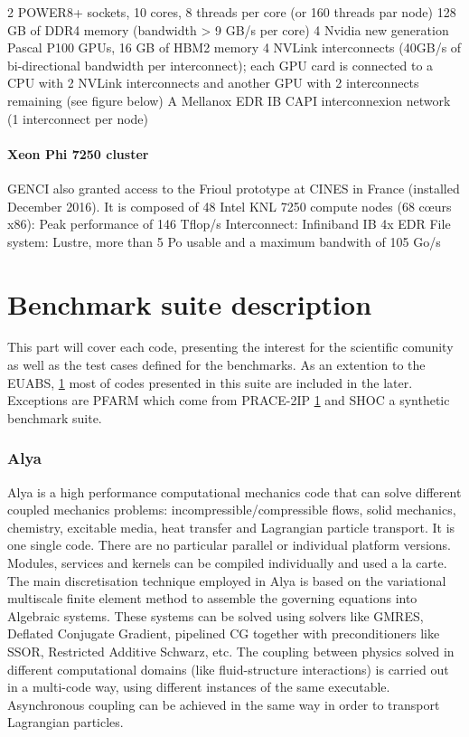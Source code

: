 2 POWER8+ sockets, 10 cores, 8 threads per core (or 160 threads par node)
128 GB of DDR4 memory (bandwidth > 9 GB/s per core)
4 Nvidia new generation Pascal P100 GPUs, 16 GB of HBM2 memory
4 NVLink interconnects (40GB/s of bi-directional bandwidth per interconnect); each GPU card is connected to a CPU with 2 NVLink interconnects and another GPU with 2 interconnects remaining (see figure below)
A Mellanox EDR IB CAPI interconnexion network (1 interconnect per node)


\subsection{Xeon Phi 7250 cluster}
GENCI also granted access to the Frioul prototype at CINES in France (installed December 2016). It is composed of 48 Intel KNL 7250 compute nodes (68 cœurs x86):
Peak performance of 146 Tflop/s
Interconnect: Infiniband IB 4x EDR
File system: Lustre, more than 5 Po usable and a maximum bandwith of 105 Go/s


\part{Benchmark suite description}
This part will cover each code, presenting the interest for the scientific comunity as well as the test cases defined for the benchmarks.
As an extention to the EUABS, \ref{} most of codes presented in this suite are included in the later. Exceptions are PFARM which come from PRACE-2IP \ref{} and SHOC a synthetic benchmark suite.

\section{Alya}
Alya is a high performance computational mechanics code that can solve different coupled mechanics problems: incompressible/compressible flows, solid mechanics, chemistry, excitable media, heat transfer and Lagrangian particle transport. It is one single code. There are no particular parallel or individual platform versions. Modules, services and kernels can be compiled individually and used a la carte. The main discretisation technique employed in Alya is based on the variational multiscale finite element method to assemble the governing equations into Algebraic systems. These systems can be solved using solvers like GMRES, Deflated Conjugate Gradient, pipelined CG together with preconditioners like SSOR, Restricted Additive Schwarz, etc. The coupling between physics solved in different computational domains (like fluid-structure interactions) is carried out in a multi-code way, using different instances of the same executable. Asynchronous coupling can be achieved in the same way in order to transport Lagrangian particles.

